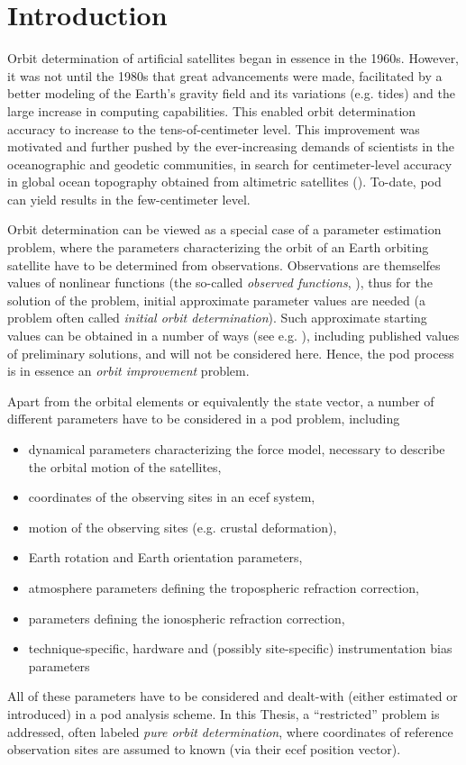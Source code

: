 \section{Introduction}\label{sec:pod-introduction}

Orbit determination of artificial satellites began in essence in the 1960s. However, 
it was not until the 1980s that great advancements were made, facilitated by
a better modeling of the Earth's gravity field and its variations (e.g. tides) and
the large increase in computing capabilities. This enabled orbit determination 
accuracy to increase to the tens-of-centimeter level. This improvement was
motivated and further pushed by the ever-increasing demands of scientists in the 
oceanographic and geodetic communities, in search for centimeter-level accuracy 
in global ocean topography obtained from altimetric satellites (\cite{Tapley2004}).
To-date, \gls{pod} can yield results in the  few-centimeter level.

Orbit determination can be viewed as a special case of a parameter estimation problem, 
where the parameters characterizing the orbit of an Earth orbiting satellite have to be 
determined from observations. Observations are themselfes values of nonlinear functions 
(the so-called \emph{observed functions}, \cite{BeutlerVII}), thus for the solution 
of the problem, initial approximate parameter values are needed (a problem often 
called \emph{initial orbit determination}). Such approximate starting values can be 
obtained in a number of ways (see e.g. \cite{Vallado2001}), including published 
values of preliminary solutions, and will not be considered here. Hence, the \gls{pod}
process is in essence an \emph{orbit improvement} problem.

Apart from the orbital elements or equivalently the state vector, a number of
different parameters have to be considered in a \gls{pod} problem, including
\begin{itemize}
    \item dynamical parameters characterizing the force model, necessary to describe 
        the orbital motion of the satellites,
    \item coordinates of the observing sites in an \gls{ecef} system,
    \item motion of the observing sites (e.g. crustal deformation),
    \item Earth rotation and Earth orientation parameters,
    \item atmosphere parameters defining the tropospheric refraction correction,
    \item parameters defining the ionospheric refraction correction,
    \item technique-specific, hardware and (possibly site-specific) instrumentation
        bias parameters
\end{itemize}
All of these parameters have to be considered and dealt-with (either estimated or 
introduced) in a \gls{pod} analysis scheme. In this Thesis, a ``restricted'' problem 
is addressed, often labeled \emph{pure orbit determination}, where coordinates of 
reference observation sites are assumed to known (via their \gls{ecef} position vector).

